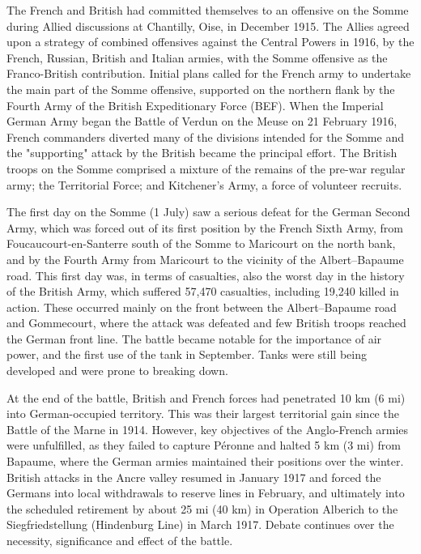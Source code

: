 \documentclass[a4paper,]{book}
\begin{document}
The French and British had committed themselves to an offensive on the Somme during Allied discussions at Chantilly, Oise, in December 1915. The Allies agreed upon a strategy of combined offensives against the Central Powers in 1916, by the French, Russian, British and Italian armies, with the Somme offensive as the Franco-British contribution. Initial plans called for the French army to undertake the main part of the Somme offensive, supported on the northern flank by the Fourth Army of the British Expeditionary Force (BEF). When the Imperial German Army began the Battle of Verdun on the Meuse on 21 February 1916, French commanders diverted many of the divisions intended for the Somme and the "supporting" attack by the British became the principal effort. The British troops on the Somme comprised a mixture of the remains of the pre-war regular army; the Territorial Force; and Kitchener's Army, a force of volunteer recruits.

The first day on the Somme (1 July) saw a serious defeat for the German Second Army, which was forced out of its first position by the French Sixth Army, from Foucaucourt-en-Santerre south of the Somme to Maricourt on the north bank, and by the Fourth Army from Maricourt to the vicinity of the Albert–Bapaume road. This first day was, in terms of casualties, also the worst day in the history of the British Army, which suffered 57,470 casualties, including 19,240 killed in action. These occurred mainly on the front between the Albert–Bapaume road and Gommecourt, where the attack was defeated and few British troops reached the German front line. The battle became notable for the importance of air power, and the first use of the tank in September. Tanks were still being developed and were prone to breaking down.

At the end of the battle, British and French forces had penetrated 10 km (6 mi) into German-occupied territory. This was their largest territorial gain since the Battle of the Marne in 1914. However, key objectives of the Anglo-French armies were unfulfilled, as they failed to capture Péronne and halted 5 km (3 mi) from Bapaume, where the German armies maintained their positions over the winter. British attacks in the Ancre valley resumed in January 1917 and forced the Germans into local withdrawals to reserve lines in February, and ultimately into the scheduled retirement by about 25 mi (40 km) in Operation Alberich to the Siegfriedstellung (Hindenburg Line) in March 1917. Debate continues over the necessity, significance and effect of the battle. 
\end{document}
